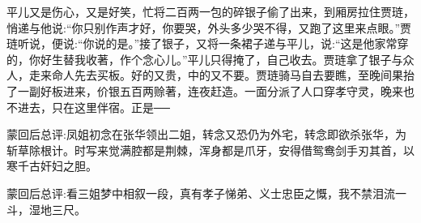 \begin{parag}
    平儿又是伤心，又是好笑，忙将二百两一包的碎银子偷了出来，到厢房拉住贾琏，悄递与他说:“你只别作声才好，你要哭，外头多少哭不得，又跑了这里来点眼。”贾琏听说，便说:“你说的是。”接了银子，又将一条裙子递与平儿，说:“这是他家常穿的，你好生替我收著，作个念心儿。”平儿只得掩了，自己收去。贾琏拿了银子与众人，走来命人先去买板。好的又贵，中的又不要。贾琏骑马自去要瞧，至晚间果抬了一副好板进来，价银五百两赊著，连夜赶造。一面分派了人口穿孝守灵，晚来也不进去，只在这里伴宿。正是──
\end{parag}


\begin{parag}
    \begin{note}蒙回后总评:凤姐初念在张华领出二姐，转念又恐仍为外宅，转念即欲杀张华，为斩草除根计。时写来觉满腔都是荆棘，浑身都是爪牙，安得借鸳鸯剑手刃其首，以寒千古奸妇之胆。\end{note}
\end{parag}


\begin{parag}
    \begin{note}蒙回后总评:看三姐梦中相叙一段，真有孝子悌弟、义士忠臣之慨，我不禁泪流一斗，湿地三尺。\end{note}
\end{parag}
